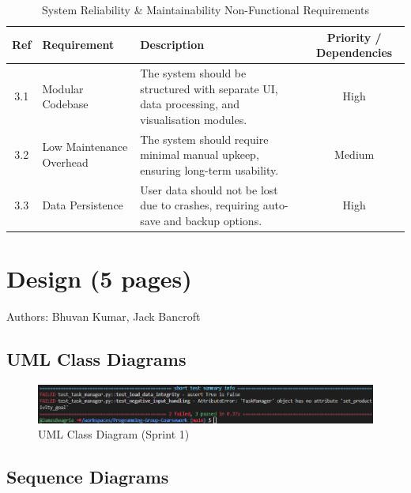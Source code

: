 \documentclass[12pt,a4paper]{article}
\begin{document}
\begin{table}[h]
    \centering

    \renewcommand{\arraystretch}{1.3} %
    \begin{tabular}{|c|l|p{5.5cm}|c|} %
        \hline
        \textbf{Ref} & \textbf{Requirement} & \textbf{Description} & \textbf{Priority / Dependencies} \\
        \hline
        3.1 & Modular Codebase & The system should be structured with separate UI, data processing, and visualisation modules. & High \\
        \hline
        3.2 & Low Maintenance Overhead & The system should require minimal manual upkeep, ensuring long-term usability. & Medium \\
        \hline
        3.3 & Data Persistence & User data should not be lost due to crashes, requiring auto-save and backup options. & High \\
        \hline
    \end{tabular}
    \caption{System Reliability \& Maintainability Non-Functional Requirements}
    \label{tab:system_reliability}
\end{table}







\newpage

\section{Design (5 pages)}

Authors: Bhuvan Kumar, Jack Bancroft
\label{sec:design}
\subsection{UML Class Diagrams}

\begin{figure}
    \centering
    \includegraphics[width=\linewidth]{image.png}
    \caption{UML Class Diagram (Sprint 1)}
    \label{fig:uml-diagram}
\end{figure}

\subsection{Sequence Diagrams}
\end{document}
